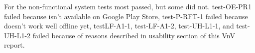 \documentclass[12pt, titlepage]{article}
\begin{document}
For the non-functional system tests most passed, but some did not. test-OE-PR1 failed because \progname{} isn't available on Google Play Store, test-P-RFT-1 failed because \progname{} doesn't work well offline yet, testLF-A1-1, test-LF-A1-2, test-UH-L1-1, and test-UH-L1-2 failed because of
reasons described in usability section of this VnV report.



		

					
					
					
					

					
					
					
					
					

		


					
\end{document}
